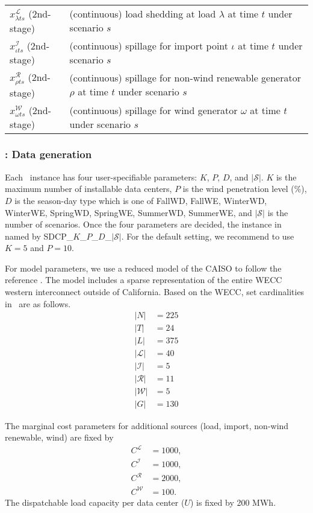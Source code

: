 \begin{table}[H]
{\begin{tabular}{ll}
			$x_{\lambda ts}^\mathcal{L}$	(2nd-stage) & (continuous) load shedding at load $\lambda$ at time $t$ under scenario $s$	\\
			$x_{\iota ts}^\mathcal{I}$	(2nd-stage) &	(continuous) spillage for import point $\iota$ at time $t$ under scenario $s$\\
			$x_{\rho ts}^\mathcal{R}$ (2nd-stage)	& (continuous) spillage for non-wind renewable generator $\rho$ at time $t$ under scenario $s$  	\\
			$x_{\omega ts}^\mathcal{W}$ (2nd-stage)	& (continuous) spillage for wind generator $\omega$ at time $t$ under scenario $s$ 	\\
			\hline
		\end{tabular}
	}
\end{table}

\subsubsection{\sdcp: Data generation}
Each \sdcp\ instance has four user-specifiable parameters: $K$, $P$, $D$, and $|\mathcal{S}|$. $K$ is the maximum number of installable data centers, $P$ is the wind penetration level (\%), $D$ is the season-day type which is one of FallWD, FallWE, WinterWD, WinterWE, SpringWD, SpringWE, SummerWD, SummerWE, and $|\mathcal{S}|$ is the number of scenarios. Once the four parameters are decided, the instance in named by SDCP\_$K$\_$P$\_$D$\_$|\mathcal{S}|$. For the default setting, we recommend to use $K=5$ and $P=10$.

For model parameters, we use a reduced model of the CAISO to follow the reference \cite{journal:KYZC2017}. The model includes a sparse representation of the entire WECC western interconnect outside of California. 
Based on the WECC, set cardinalities in \sdcp\ are as follows.
\begin{align*}
|N|&=225 \\
|T|&=24 \\
|L|&=375 \\
|\mathcal{L}|&=40\\
|\mathcal{I}|&=5\\
|\mathcal{R}|&=11\\
|\mathcal{W}|&=5\\
|G|&=130
\end{align*}

The marginal cost parameters for additional sources (load, import, non-wind renewable, wind) are fixed by
\begin{align*}
C^\mathcal{L}&=1000,\\
C^\mathcal{I}&=1000,\\
C^\mathcal{R}&=2000,\\
C^\mathcal{W}&=100.
\end{align*}
The dispatchable load capacity per data center ($U$) is fixed by 200 MWh.

